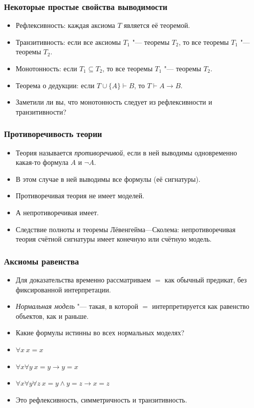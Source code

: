 \documentclass[10pt]{beamer}
\begin{document}
\begin{frame}
    \frametitle{Некоторые простые свойства выводимости}
    \begin{itemize}
        \item Рефлексивность: каждая аксиома $T$ является её теоремой.
        \pause
        \item Транзитивность: если все аксиомы $T_1$ "--- теоремы $T_2$, то все теоремы $T_1$ "--- теоремы $T_2$.
        \pause
        \item Монотонность: если $T_1 \subseteq T_2$, то все теоремы $T_1$ "--- теоремы $T_2$.
        \pause
        \item Теорема о дедукции: если $T \cup \{A\} \vdash B$, то $T \vdash A \to B$.
        \pause
        \item Заметили ли вы, что монотонность следует из рефлексивности и транзитивности?
    \end{itemize}
\end{frame}

\begin{frame}
    \frametitle{Противоречивость теории}
    \begin{itemize}
        \item Теория называется \emph{противоречивой}, если в ней выводимы одновременно какая-то формула $A$ и $\neg A$.
        \item В этом случае в ней выводимы все формулы (её сигнатуры).
        \item Противоречивая теория не имеет моделей.
        \item А непротиворечивая имеет.
        \item Следствие полноты и теоремы Лёвенгейма---Сколема: непротиворечивая теория счётной сигнатуры имеет конечную или счётную модель.
    \end{itemize}
\end{frame}

\begin{frame}
    \frametitle{Аксиомы равенства}
    \begin{itemize}
        \item Для доказательства временно рассматриваем $=$ как обычный предикат, без фиксированной интерпретации.
        \item \emph{Нормальная модель} "--- такая, в которой $=$ интерпретируется как равенство объектов, как и раньше.
        \item Какие формулы истинны во всех нормальных моделях?
        \pause
        \item $\forall x ~ x=x$
        \item $\forall x \forall y ~ x=y \to y=x$
        \item $\forall x \forall y \forall z ~ x=y \land y=z \to x=z$
        \item Это рефлексивность, симметричность и транзитивность.
    \end{itemize}
\end{frame}
\end{document}
